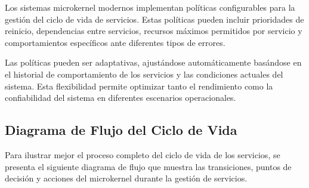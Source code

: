 \documentclass[12pt,a4paper]{article}
\begin{document}
Los sistemas microkernel modernos implementan políticas configurables para la gestión del ciclo de vida de servicios. Estas políticas pueden incluir prioridades de reinicio, dependencias entre servicios, recursos máximos permitidos por servicio y comportamientos específicos ante diferentes tipos de errores.

Las políticas pueden ser adaptativas, ajustándose automáticamente basándose en el historial de comportamiento de los servicios y las condiciones actuales del sistema. Esta flexibilidad permite optimizar tanto el rendimiento como la confiabilidad del sistema en diferentes escenarios operacionales.

\subsection{Diagrama de Flujo del Ciclo de Vida}

Para ilustrar mejor el proceso completo del ciclo de vida de los servicios, se presenta el siguiente diagrama de flujo que muestra las transiciones, puntos de decisión y acciones del microkernel durante la gestión de servicios.
\end{document}
